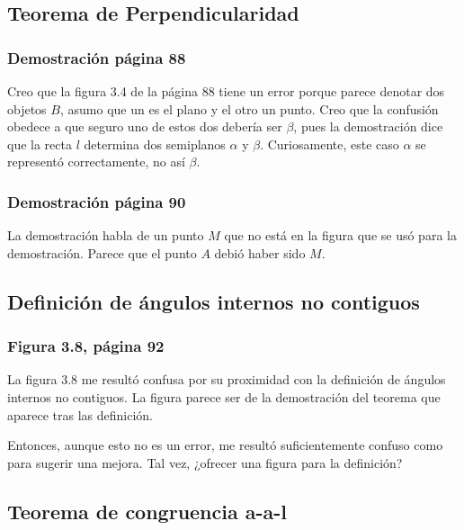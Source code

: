 \subsection{Teorema de Perpendicularidad}
\subsubsection{Demostración página 88}

Creo que la figura 3.4 de la página 88 tiene un error porque parece denotar dos objetos \(B\), asumo que un es el plano y el otro un punto. Creo que la confusión obedece a que seguro uno de estos dos debería ser $\beta$, pues la demostración dice que la recta \(l\) determina dos semiplanos \(\alpha\) y \(\beta\). Curiosamente, este caso $\alpha$ se representó correctamente, no así $\beta$.

\subsubsection{Demostración página 90}

La demostración habla de un punto \(M\) que no está en la figura que se usó para la demostración. Parece que el punto \(A\) debió haber sido \(M\).


\subsection{Definición de ángulos internos no contiguos}
\subsubsection{Figura 3.8, página 92}

La figura 3.8 me resultó confusa por su proximidad con la definición de ángulos internos no contiguos. La figura parece ser de la demostración del teorema que aparece tras las definición.

Entonces, aunque esto no es un error, me resultó suficientemente confuso como para sugerir una mejora. Tal vez, ¿ofrecer una figura para la definición?

\begin{figure}[!h]
    \centering
    
    \label{fig:interior-exterior-angles}
\end{figure}

\subsection{Teorema de congruencia a-a-l}
